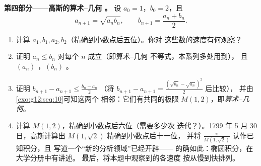 \begin{problem}
\medskip
\noindent\textbf{第四部分——高斯的算术--几何
。}
设 $a_0 = 1$，$b_0 = 2$，且
\[
a_{n+1} = \sqrt{a_n b_n},
\qquad
b_{n+1} = \frac{a_n + b_n}{2} .
\]
\begin{enumerate}[resume]
  \item 计算 $a_1, b_1, a_2, b_2$（精确到小数点后五位）。你对
        这些数的速度有何观察？
  \item 证明 $a_n \leq b_n$ 对每个 $n$ 成立（即算术--几何
        不等式，本系列多处用到），
        且 $(a_n)$ ，$(b_n)$ 。
  \item 证明
        $b_{n+1} - a_{n+1} \leq \frac{b_n - a_n}{2}$
        （将 $b_{n+1} - a_{n+1} =
        \frac{(\sqrt{b_n} - \sqrt{a_n})^2}{2}$ 后比较），
        并由\cref{exo:g12:seq:10}可知这两个
        相邻：它们有共同的极限
        $M(1, 2)$，即\emph{算术--几何}。
  \item 计算 $M(1, 2)$，精确到小数点后六位（需要多少次
        迭代？）。1799 年 5 月 30 日，高斯计算出
        $M(1, \sqrt2)$ 精确到小数点后十一位，
        并将 $\frac{\pi}{M(1,\sqrt2)}$ 认作已知积分，且
        写道一个“新的分析领域”已经开辟——
        的确如此：椭圆积分，在大学分册中有讲述。
        最后，将本题中观察到的各速度
        按从慢到快排列。
\end{enumerate}
\end{problem}
